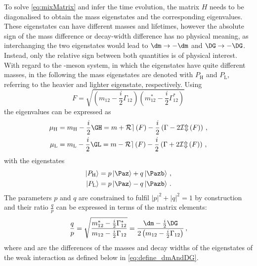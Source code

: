 To solve \cref{eq:mixMatrix} and infer the time evolution, the matrix $H$ needs to be diagonalised to obtain the mass eigenstates and the corresponding eigenvalues.
These eigenstates can have different masses and lifetimes, however the absolute sign of the mass difference \dm or decay-width difference \DG has no physical meaning, as interchanging the two eigenstates would lead to $\dm\to-\dm$ and $\DG\to-\DG$.
Instead, only the relative sign between both quantities is of physical interest.
With regard to the \Bz-meson system, in which the eigenstates have quite different masses, in the following the mass eigenstates are denoted with $P_\text{H}$ and $P_\text{L}$, referring to the heavier and lighter eigenstate, respectively.
Using
\begin{equation}
F=\sqrt{\left(m_{12}-\frac{i}{2}\Gamma_{12}\right)\left(m_{12}^\ast-\frac{i}{2}\Gamma_{12}^\ast\right)}
\end{equation}
the eigenvalues can be expressed as
\begin{equation}
\begin{split}
\mu_\text{H} &= m_\text{H}-\frac{i}{2}\GH = m + \mathcal{Re}\left(F\right)-\frac{i}{2}\left(\Gamma-2\mathcal{Im}\left(F\right)\right)\,,\\
\mu_\text{L} &= m_\text{L}-\frac{i}{2}\GL = m - \mathcal{Re}\left(F\right)-\frac{i}{2}\left(\Gamma+2\mathcal{Im}\left(F\right)\right)\,,\label{eq:Mass_eigenvalues}
\end{split}
\end{equation}
with the eigenstates
\begin{equation}
\begin{split}
\left|P_\text{H}\right>&= p\left|\Paz\right>+q\left|\Pazb\right>\,,\\
\left|P_\text{L}\right>&= p\left|\Paz\right>-q\left|\Pazb\right>\,.\label{eq:Mass_eigenstates}
\end{split}
\end{equation}
The parameters $p$ and $q$ are constrained to fulfil $\left|p\right|^2\!+\left|q\right|^2=1$ by construction and their ratio $\frac{q}{p}$ can be expressed in terms of the matrix elements:
\begin{equation}
\frac{q}{p}=\sqrt{ \frac{ m_{12}^\ast-\frac{i}{2}\Gamma_{12}^\ast }{ m_{12}-\frac{i}{2}\Gamma_{12} }}
=\frac{\dm-\frac{i}{2}\DG}{2\left(m_{12}-\frac{i}{2}\Gamma_{12}\right)}\,,\label{eq:qoverp}
\end{equation}
where \dm and \DG are the differences of the masses and decay widths of the eigenstates of the weak interaction as defined below in \cref{eq:define_dmAndDG}.
